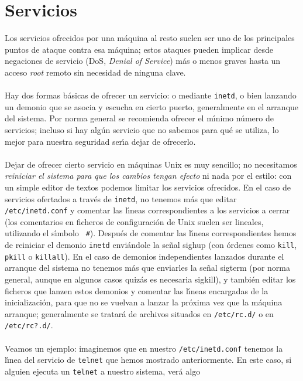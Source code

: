 \section{Servicios}
\label{serv}
Los servicios ofrecidos por una m\'aquina al resto suelen ser uno de los 
principales puntos de ataque contra esa m\'aquina; estos ataques pueden implicar
desde negaciones de servicio (DoS, {\it Denial of Service}) m\'as o menos 
graves hasta un acceso {\it root} remoto sin necesidad de ninguna clave.\\
\\Hay dos formas b\'asicas de ofrecer un servicio: o mediante {\tt inetd}, o
bien lanzando un demonio que se asocia y escucha en cierto puerto, generalmente
en el arranque del sistema. Por norma general se recomienda ofrecer el 
m\'{\i}nimo n\'umero de servicios; incluso si hay alg\'un servicio que no 
sabemos para qu\'e se utiliza, lo mejor para nuestra seguridad ser\'{\i}a dejar 
de ofrecerlo.\\
\\Dejar de ofrecer cierto servicio en m\'aquinas Unix es muy sencillo; no 
necesitamos {\it reiniciar el sistema para que los cambios tengan efecto} ni
nada por el estilo: con un simple editor de textos podemos limitar los servicios
ofrecidos. En el caso de servicios ofertados a trav\'es de {\tt inetd}, no 
tenemos m\'as que editar {\tt /etc/inetd.conf} y comentar las l\'{\i}neas
correspondientes a los servicios a cerrar (los comentarios en ficheros de
configuraci\'on de Unix suelen ser lineales, utilizando el s\'{\i}mbolo {\tt 
\#}). Despu\'es de comentar las l\'{\i}neas correspondientes hemos de reiniciar
el demonio {\tt inetd} envi\'andole la se\~nal {\sc sighup} (con \'ordenes como
{\tt kill}, {\tt pkill} o {\tt killall}). En el caso de demonios independientes
lanzados durante el arranque del sistema no tenemos m\'as que enviarles la
se\~nal {\sc sigterm} (por norma general, aunque en algunos casos quiz\'as es
necesaria {\sc sigkill}), y tambi\'en editar los ficheros que lanzen estos 
demonios y comentar las l\'{\i}neas encargadas de la inicializaci\'on, para que
no se vuelvan a lanzar la pr\'oxima vez que la m\'aquina arranque; generalmente 
se tratar\'a de archivos situados en {\tt /etc/rc.d/} o en {\tt /etc/rc?.d/}.\\
\\Veamos un ejemplo: imaginemos que en nuestro {\tt /etc/inetd.conf} tenemos
la l\'{\i}nea del servicio de {\tt telnet} que hemos mostrado anteriormente. En
este caso, si alguien ejecuta un {\tt telnet} a nuestro sistema, ver\'a algo 
